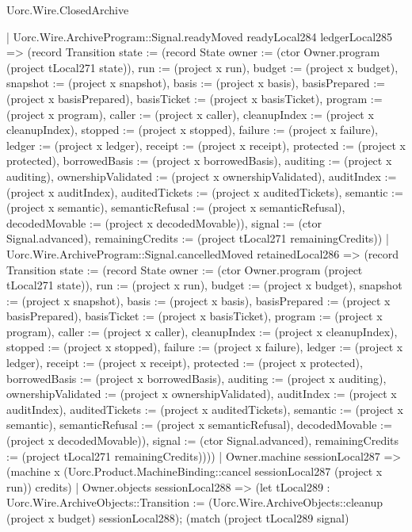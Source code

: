 \begin{lexlean}{Uorc.Wire.ClosedArchive}
\begin{semanticmodule}
{      | Uorc.Wire.ArchiveProgram::Signal.readyMoved readyLocal284 ledgerLocal285 => (record Transition {state := (record State {owner := (ctor Owner.program (project tLocal271 state)), run := (project x run), budget := (project x budget), snapshot := (project x snapshot), basis := (project x basis), basisPrepared := (project x basisPrepared), basisTicket := (project x basisTicket), program := (project x program), caller := (project x caller), cleanupIndex := (project x cleanupIndex), stopped := (project x stopped), failure := (project x failure), ledger := (project x ledger), receipt := (project x receipt), protected := (project x protected), borrowedBasis := (project x borrowedBasis), auditing := (project x auditing), ownershipValidated := (project x ownershipValidated), auditIndex := (project x auditIndex), auditedTickets := (project x auditedTickets), semantic := (project x semantic), semanticRefusal := (project x semanticRefusal), decodedMovable := (project x decodedMovable)}), signal := (ctor Signal.advanced), remainingCredits := (project tLocal271 remainingCredits)})
      | Uorc.Wire.ArchiveProgram::Signal.cancelledMoved retainedLocal286 => (record Transition {state := (record State {owner := (ctor Owner.program (project tLocal271 state)), run := (project x run), budget := (project x budget), snapshot := (project x snapshot), basis := (project x basis), basisPrepared := (project x basisPrepared), basisTicket := (project x basisTicket), program := (project x program), caller := (project x caller), cleanupIndex := (project x cleanupIndex), stopped := (project x stopped), failure := (project x failure), ledger := (project x ledger), receipt := (project x receipt), protected := (project x protected), borrowedBasis := (project x borrowedBasis), auditing := (project x auditing), ownershipValidated := (project x ownershipValidated), auditIndex := (project x auditIndex), auditedTickets := (project x auditedTickets), semantic := (project x semantic), semanticRefusal := (project x semanticRefusal), decodedMovable := (project x decodedMovable)}), signal := (ctor Signal.advanced), remainingCredits := (project tLocal271 remainingCredits)})))
    | Owner.machine sessionLocal287 => (machine x (Uorc.Product.MachineBinding::cancel sessionLocal287 (project x run)) credits)
    | Owner.objects sessionLocal288 => (let tLocal289 : Uorc.Wire.ArchiveObjects::Transition := (Uorc.Wire.ArchiveObjects::cleanup (project x budget) sessionLocal288); (match (project tLocal289 signal)
}
\end{semanticmodule}
\end{lexlean}
